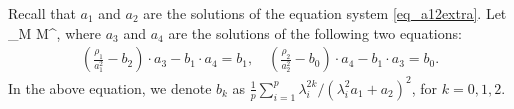 \begin{definition}
Recall that $a_1$ and $a_2$ are the solutions of the equation system \eqref{eq_a12extra}. Let
	\be\label{def Pibias} \Pi_\bias {}  M  M^{\top}, \ee
where $a_{3}$ and $a_4$ are the solutions of the following two equations:
\begin{gather}\label{eq_a34extra}
		\left(\frac{\rho_1}{a_1^{2}} -  b_2  \right)\cdot  a_3 -  b_1 \cdot  a_4 = b_1,\quad \left(\frac{\rho_2}{a_2^{2}}-  b_0\right)\cdot  a_4 - b_1 \cdot  a_3
		= b_0 .
	\end{gather}
In the above equation, we denote $b_k$ as $\frac1{p}\sum_{i=1}^p {\lambda_i^{2k}} / { (\lambda_i^2 a_1 + a_2)^2  }$, for $k = 0, 1, 2$.
\end{definition}

